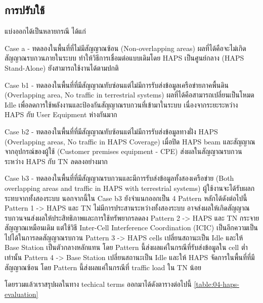 \subsection{การปรับใช้}
แบ่งออกได้เป็นหลายกรณี ได้แก่

\begin{description}
    \item Case a - ทดลองในพื้นที่ที่ไม่มีสัญญาณซ้อน (Non-overlapping areas) ผลที่ได้คือจะไม่เกิดสัญญาณรบกวนภายในระบบ
            ทำให้วิธีการเชื่อมต่อแบบเดิมโดย HAPS เป็นศูนย์กลาง (HAPS Stand-Alone) ยังสามารถใช้งานได้ตามปกติ
    \item Case b1 - ทดลองในพื้นที่ที่มีสัญญาณทับซ่อนแต่ไม่มีการรับส่งข้อมูลเครือข่ายภาคพื้นดิน (Overlapping area, No traffic in terrestrial systems) 
            ผลที่ได้คือสามารถเปลี่ยนเป็นโหมด Idle เพื่อลดการใช้พลังงานและป้องกันสัญญาณรบกวนที่เข้ามาในระบบ เนื่องจากระยะระหว่าง HAPS กับ User Equipment ห่างกันมาก
    \item Case b2 - ทดลองในพื้นที่ที่มีสัญญาณทับซ้อนแต่ไม่มีการรับส่งข้อมูลทางฝั่ง HAPS (Overlapping areas, No traffic in HAPS Coverage) 
            เมื่อปิด HAPS beam และสัญญาณจากอุปกรณ์ของผู้ใช้ (Customer premises equipment - CPE) ส่งผลในสัญญาณรบกวนระหว่าง HAPS กับ TN ลดลงอย่างมาก
    \item Case b3 - ทดลองในพื้นที่ที่มีสัญญาณรบกวนและมีการรับส่งข้อมูลทั้งสองเครือข่าย (Both overlapping areas and traffic in HAPS with terrestrial systems) 
            ผู้ใช้งานจะได้รับผลกระทบจากทั้งสองระบบ นอกจากนี้ใน Case b3 ยังจำแนกออกเป็น 4 Pattern หลักได้ดังต่อไปนี้ 
            Pattern 1 -> HAPS และ TN ไม่มีการประสานระหว่างทั้งสองระบบ อาจส่งผลให้เกิดสัญญาณรบกวนจนส่งผลให้ประสิทธิภาพและการใช้ทรัพยากรลดลง
            Pattern 2 -> HAPS และ TN กระจายสัญญาณเหมือนเดิม แต่ใช้วิธี Inter-Cell Interference Coordination (ICIC) เป็นอีกความเป็นไปได้ในการลดสัญญาณรบกวน
            Pattern 3 -> HAPS cells เปลี่ยนสถานะเป็น Idle และให้ Base Station เป็นตัวกลางหลักแทน โดย Pattern นี้ส่งผลแค่ในกรณีที่รับส่งข้อมูลใน cell ต่ำเท่านั้น
            Pattern 4 -> Base Station เปลี่ยนสถานะเป็น Idle และให้ HAPS จัดการในพื้นที่ที่มีสัญญาณซ้อน โดย Pattern นี้ส่งผลแค่ในกรณีที่ traffic load ใน TN น้อย
\end{description}

โดยรวมแล้วเราสรุปผลในทาง techical terms ออกมาได้ดังตารางต่อไปนี้ \ref{table:04-haps-evaluation}

